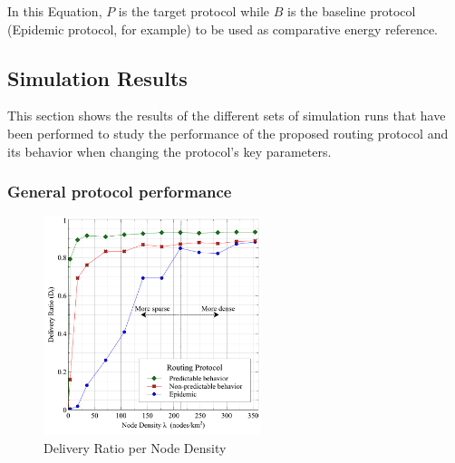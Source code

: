 \documentclass[conference]{IEEEtran}
\begin{document}

In this Equation, $P$ is the target protocol while $B$ is the baseline protocol (Epidemic protocol, for example) to be used as comparative energy reference.




\subsection{Simulation Results}

This section shows the results of the different sets of simulation runs that have been performed to study the performance of the proposed routing protocol and its behavior when changing the protocol's key parameters.
\subsubsection{General protocol performance}

\begin{figure}[!t]
	\centering
	\includegraphics[width=2.5in]{Graphs/DeliveryRatio.pdf}
	\caption{Delivery Ratio per Node Density}
	\label{Delivery Ratio per Node Density}
\end{figure}
\end{document}

